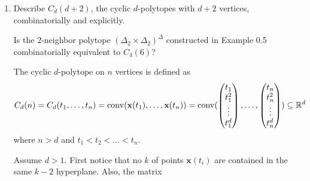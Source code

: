 \documentclass{article}
\begin{document}
\begin{enumerate}
\begin{solution}
\smallskip

Given a linear function $f \in (\mathbb{R}^d)^*, f = (f_1, f_2, \ldots, f_d)$, we want to find the maximum point $p \in P$ to maximize $\langle f^T, p\rangle$. Consider the scaled cube $C_{d, f} = \boxplus_{i=1}^d [0,f_ie_i]$. We can easily find the maximum $c$ in $C_{d, f}$, which must be a vertex, by analyzing the sign of the vector $f^T$. The maximum $p \in P$ is then the closest point to $c$.

\smallskip
Let the generating points be $x_1, x_2, \ldots, x_n$, where $P = \conv(x_1, \ldots, x_n)$. We can tell if $y \in P$ by checking if there exists an convex combination

\[y = \sum_{i=1}^n \lambda_ix_i, \quad \sum_{i=1}^n \lambda_i \leq 1, \quad \lambda_i \geq 0\]

Then, if $y \not \in P$, consider a point $p\in P$ and connect edge $(p, y)$. Consider the affine plane of the face of $P$ which this edge intersects. This affine plane splits $P$ and y. Also, Farkas lemma IV later shows that if $y \notin P$, there exists a row vector $\bi{a}$ which separates $y$ from $P$, as in $\bi{ax} \leq \alpha$ is satisfied by all $\bi{x} \in P$, but not $\bi{y}$.
\end{solution}

\item Describe $C_d(d+2)$, the cyclic $d$-polytopes with $d+2$ vertices, combinatorially and explicitly.

\smallskip
Is the $2$-neighbor polytope $(\Delta_2 \times \Delta_2)^{\Delta}$ constructed in Example 0.5 combinatorially equivalent to $C_4(6)$?

\begin{solution}
The cyclic $d$-polytope on $n$ vertices is defined as 
\[C_d(n) = C_d(t_1, \ldots, t_n) = \operatorname{conv}(\textbf{x}(t_1), \ldots, \textbf{x}(t_n)) = \operatorname{conv}(\begin{pmatrix}
    t_1 \\
    t_1^2 \\
    \vdots \\
    t_1^d
\end{pmatrix}, \ldots, \begin{pmatrix}
    t_n \\
    t_n^2 \\
    \vdots \\
    t_n^d
\end{pmatrix}) \subseteq \mathbb{R}^d\]
where $n>d$ and $t_1 < t_2 < \ldots < t_n$.

Assume $d>1$. First notice that no $k$ of points $\textbf{x}(t_i)$ are contained in the same $k-2$ hyperplane. Also, the matrix


\end{solution}
\end{enumerate}
\end{document}
